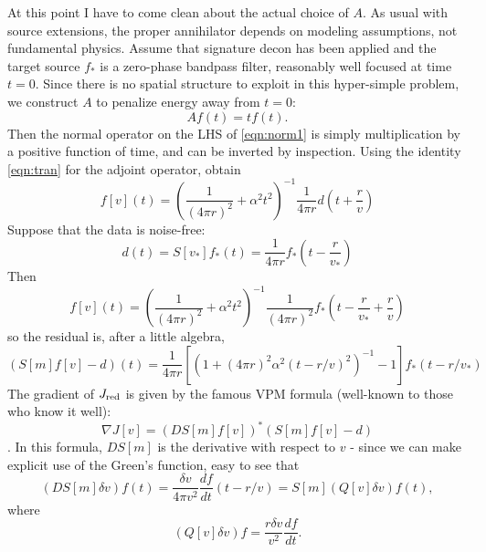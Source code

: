 At this point I have to come clean about the actual choice of $A$. As usual with source extensions, the proper annihilator depends on modeling assumptions, not fundamental physics. Assume that signature decon has been applied and the target source $f_*$ is a zero-phase bandpass filter, reasonably well focused at time $t=0$. Since there is no spatial structure to exploit in this hyper-simple problem, we construct $A$ to penalize energy away from $t=0$:
\begin{equation}
\label{eqn:ann}
Af(t) = tf(t).
\end{equation}
Then the normal operator on the LHS of \ref{eqn:norm1} is simply multiplication by a positive function of time, and can be inverted by inspection. Using the identity \ref{eqn:tran} for the adjoint operator, obtain
\begin{equation}
\label{eqn:soln} 
f[v](t) = \left(\frac{1}{(4\pi r)^2} + \alpha^2 t^2\right)^{-1}\frac{1}{4\pi r}d\left(t+\frac{r}{v}\right)  
\end{equation} 
Suppose that the data is noise-free: 
\begin{equation}
\label{eqn:nonoise}
d(t) = S[v_*]f_*(t) = \frac{1}{4\pi r}f_*\left(t-\frac{r}{v_*}\right)
\end{equation}
Then
\begin{equation}
\label{eqn:solnnon}
f[v](t) = \left(\frac{1}{(4\pi r)^2} + \alpha^2 t^2\right)^{-1}\frac{1}{(4\pi r)^2}f_*\left(t-\frac{r}{v_*}+\frac{r}{v}\right) 
\end{equation}
so the residual is, after a little algebra,
\begin{equation}
\label{eqn:resid}
(S[m]f[v]-d)(t) =\frac{1}{4\pi r}[ (1+(4\pi r)^2 \alpha^2 (t-r/v)^2)^{-1} - 1]f_*(t-r/v_*)
\end{equation}
The gradient of $J_{\rm red}$ is given by the famous VPM formula (well-known to those who know it well):
\begin{equation}
\label{eqn:grad}
\nabla J[v] = (DS[m]f[v])^*(S[m]f[v]-d)
\end{equation}.
In this formula, $DS[m]$ is the derivative with respect to $v$ - since we can make explicit use of the Green's function, easy to see that
\begin{equation}
\label{eqn:deriv}
(DS[m]\delta v)f (t) = \frac{\delta v}{4\pi v^2}\frac{df}{dt}(t-r/v) = S[m](Q[v]\delta v)f (t),
\end{equation}
where 
\begin{equation}
\label{eqn:defq}
(Q[v]\delta v)f = \frac{r \delta v}{v^2} \frac{df}{dt}.
\end{equation}
